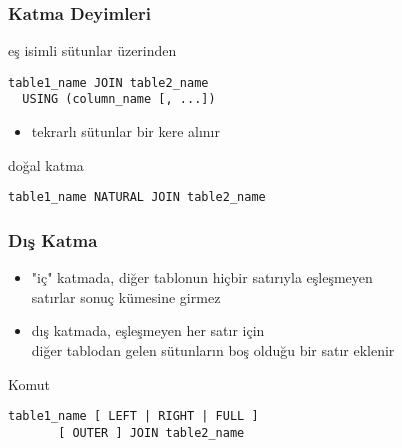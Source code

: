 \documentclass[dvipsnames]{beamer}
\theoremstyle{definition}
\theoremstyle{example}
\theoremstyle{plain}
\begin{document}
\begin{frame}[fragile]
  \frametitle{Katma Deyimleri}

  \begin{block}{eş isimli sütunlar üzerinden}
    \begin{lstlisting}
table1_name JOIN table2_name
  USING (column_name [, ...])
    \end{lstlisting}
  \end{block}

  \begin{itemize}
    \item tekrarlı sütunlar bir kere alınır
  \end{itemize}

  \pause
  \begin{block}{doğal katma}
    \begin{lstlisting}
table1_name NATURAL JOIN table2_name
    \end{lstlisting}
  \end{block}
\end{frame}

\begin{frame}[fragile]
  \frametitle{Dış Katma}

  \begin{itemize}
    \item "iç" katmada, diğer tablonun hiçbir satırıyla eşleşmeyen\\
      satırlar sonuç kümesine girmez

    \item dış katmada, eşleşmeyen her satır için\\
      diğer tablodan gelen sütunların boş olduğu bir satır eklenir
  \end{itemize}

  \pause
  \begin{block}{Komut}
    \begin{lstlisting}
table1_name [ LEFT | RIGHT | FULL ]
       [ OUTER ] JOIN table2_name
    \end{lstlisting}
  \end{block}
\end{frame}
\end{document}
